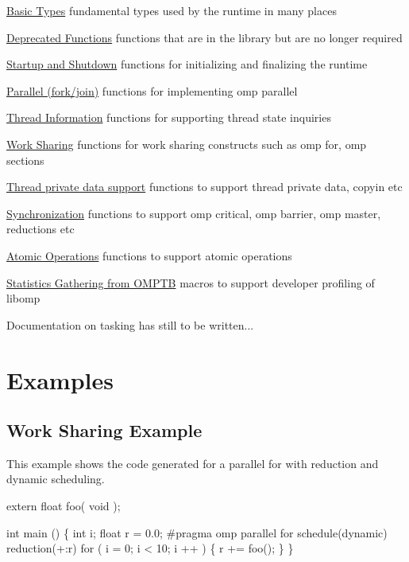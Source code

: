 \begin{DoxyItemize}
\item \hyperlink{group__BASIC__TYPES}{Basic Types} fundamental types used by the runtime in many places
\item \hyperlink{group__DEPRECATED}{Deprecated Functions} functions that are in the library but are no longer required
\item \hyperlink{group__STARTUP__SHUTDOWN}{Startup and Shutdown} functions for initializing and finalizing the runtime
\item \hyperlink{group__PARALLEL}{Parallel (fork/join)} functions for implementing {\ttfamily omp parallel}
\item \hyperlink{group__THREAD__STATES}{Thread Information} functions for supporting thread state inquiries
\item \hyperlink{group__WORK__SHARING}{Work Sharing} functions for work sharing constructs such as {\ttfamily omp for}, {\ttfamily omp sections}
\item \hyperlink{group__THREADPRIVATE}{Thread private data support} functions to support thread private data, copyin etc
\item \hyperlink{group__SYNCHRONIZATION}{Synchronization} functions to support {\ttfamily omp critical}, {\ttfamily omp barrier}, {\ttfamily omp master}, reductions etc
\item \hyperlink{group__ATOMIC__OPS}{Atomic Operations} functions to support atomic operations
\item \hyperlink{group__STATS__GATHERING}{Statistics Gathering from O\-M\-P\-T\-B} macros to support developer profiling of libomp
\item Documentation on tasking has still to be written...
\end{DoxyItemize}\hypertarget{index_SEC_EXAMPLES}{}\section{Examples}\label{index_SEC_EXAMPLES}
\hypertarget{index_SEC_WORKSHARING_EXAMPLE}{}\subsection{Work Sharing Example}\label{index_SEC_WORKSHARING_EXAMPLE}
This example shows the code generated for a parallel for with reduction and dynamic scheduling.


\begin{DoxyCode}
\textcolor{keyword}{extern} \textcolor{keywordtype}{float} foo( \textcolor{keywordtype}{void} );

\textcolor{keywordtype}{int} main () \{
    \textcolor{keywordtype}{int} i; 
    \textcolor{keywordtype}{float} r = 0.0; 
\textcolor{preprocessor}{    #pragma omp parallel for schedule(dynamic) reduction(+:r) }
\textcolor{preprocessor}{}    \textcolor{keywordflow}{for} ( i = 0; i < 10; i ++ ) \{
        r += foo(); 
    \}
\}
\end{DoxyCode}


